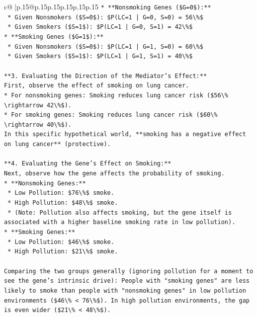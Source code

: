 \documentclass{article}
\begin{document}
{\begin{supertabular}{c@{$\;$}|p{.15\linewidth}@{}p{.15\linewidth}p{.15\linewidth}p{.15\linewidth}p{.15\linewidth}p{.15\linewidth}}
{{{\texttt{*   **Nonsmoking Genes (\$G=0\$):**} \\
\texttt{    *   Given Nonsmokers (\$S=0\$): \$P(LC=1 | G=0, S=0) = 56\textbackslash{}\%\$} \\
\texttt{    *   Given Smokers (\$S=1\$): \$P(LC=1 | G=0, S=1) = 42\textbackslash{}\%\$} \\
\texttt{*   **Smoking Genes (\$G=1\$):**} \\
\texttt{    *   Given Nonsmokers (\$S=0\$): \$P(LC=1 | G=1, S=0) = 60\textbackslash{}\%\$} \\
\texttt{    *   Given Smokers (\$S=1\$): \$P(LC=1 | G=1, S=1) = 40\textbackslash{}\%\$} \\
\\ 
\texttt{**3. Evaluating the Direction of the Mediator's Effect:**} \\
\texttt{First, observe the effect of smoking on lung cancer.} \\
\texttt{*   For nonsmoking genes: Smoking reduces lung cancer risk (\$56\textbackslash{}\% \textbackslash{}rightarrow 42\textbackslash{}\%\$).} \\
\texttt{*   For smoking genes: Smoking reduces lung cancer risk (\$60\textbackslash{}\% \textbackslash{}rightarrow 40\textbackslash{}\%\$).} \\
\texttt{In this specific hypothetical world, **smoking has a negative effect on lung cancer** (protective).} \\
\\ 
\texttt{**4. Evaluating the Gene's Effect on Smoking:**} \\
\texttt{Next, observe how the gene affects the probability of smoking.} \\
\texttt{*   **Nonsmoking Genes:**} \\
\texttt{    *   Low Pollution: \$76\textbackslash{}\%\$ smoke.} \\
\texttt{    *   High Pollution: \$48\textbackslash{}\%\$ smoke.} \\
\texttt{    *   (Note: Pollution also affects smoking, but the gene itself is associated with a higher baseline smoking rate in low pollution).} \\
\texttt{*   **Smoking Genes:**} \\
\texttt{    *   Low Pollution: \$46\textbackslash{}\%\$ smoke.} \\
\texttt{    *   High Pollution: \$21\textbackslash{}\%\$ smoke.} \\
\\ 
\texttt{Comparing the two groups generally (ignoring pollution for a moment to see the gene's intrinsic drive): People with "smoking genes" are less likely to smoke than people with "nonsmoking genes" in low pollution environments (\$46\textbackslash{}\% < 76\textbackslash{}\%\$). In high pollution environments, the gap is even wider (\$21\textbackslash{}\% < 48\textbackslash{}\%\$).} \\
}}}
\end{supertabular}}
\end{document}
